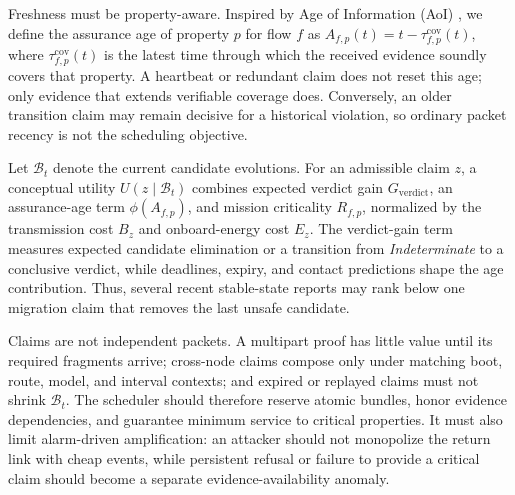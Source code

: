 \documentclass[journal]{IEEEtran}
\begin{document}
Freshness must be property-aware. Inspired by Age of Information (AoI)
\cite{yates2021aoi}, we define the assurance age of property \(p\) for flow \(f\)
as \(A_{f,p}(t)=t-\tau_{f,p}^{\mathrm{cov}}(t)\), where
\(\tau_{f,p}^{\mathrm{cov}}(t)\) is the latest time through which the received
evidence soundly covers that property. A heartbeat or redundant claim does not
reset this age; only evidence that extends verifiable coverage does. Conversely,
an older transition claim may remain decisive for a historical violation, so
ordinary packet recency is not the scheduling objective.

Let \(\mathcal{B}_t\) denote the current candidate evolutions. For an admissible
claim \(z\), a conceptual utility \(U(z\mid\mathcal{B}_t)\) combines expected
verdict gain \(G_{\mathrm{verdict}}\), an assurance-age term
\(\phi(A_{f,p})\), and mission criticality \(R_{f,p}\), normalized by the
transmission cost \(B_z\) and onboard-energy cost \(E_z\). The verdict-gain term
measures expected candidate elimination or a transition from
\emph{Indeterminate} to a conclusive verdict, while deadlines, expiry, and
contact predictions shape the age contribution. Thus, several recent
stable-state reports may rank below one migration claim that removes the last
unsafe candidate.

Claims are not independent packets. A multipart proof has little value until its
required fragments arrive; cross-node claims compose only under matching boot,
route, model, and interval contexts; and expired or replayed claims must not
shrink \(\mathcal{B}_t\). The scheduler should therefore reserve atomic bundles,
honor evidence dependencies, and guarantee minimum service to critical
properties. It must also limit alarm-driven amplification: an attacker should
not monopolize the return link with cheap events, while persistent refusal or
failure to provide a critical claim should become a separate
evidence-availability anomaly.
\end{document}

